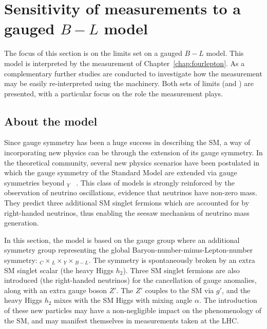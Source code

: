 \section{Sensitivity of \LHC measurements to a gauged $B-L$ model}
\label{sec:BL}
The focus of this section is on the limits set on a gauged $B-L$ model. This model is interpreted by the \ATLAS \mFourL{} measurement of Chapter~\ref{chap:fourlepton}. As a complementary further studies are conducted to investigate how the \mFourL{} measurement may be easily re-interpreted using the \contur machinery. Both sets of limits (\ATLAS and \contur) are presented, with a particular focus on the role the \mFourL{} measurement plays. 

\subsection{About the model}
Since gauge symmetry has been a huge success in describing the SM, a way of incorporating new physics can be through the extension of its gauge symmetry. In the theoretical community, several new physics scenarios have been postulated in which the gauge symmetry of the Standard Model are extended via  gauge symmetries beyond $_Y$ \cite{Pollard:2017sjg,PhysRevD-95-035025}~. This class of models is strongly reinforced by the observation of neutrino oscillations, evidence that neutrinos have non-zero mass. They predict three additional SM singlet fermions which are accounted for by right-handed neutrinos, thus enabling the seesaw mechanism of neutrino mass generation. 

In this section, the model is based on the gauge group where an additional \BLgroup{} symmetry group representing the global Baryon-number-minus-Lepton-number symmetry: $_C\times$$_L\times$$_Y\times$$_{B-L}$. The symmetry is spontaneously broken by an extra SM singlet scalar (the heavy Higgs $h_2$). Three SM singlet fermions are also introduced (the right-handed neutrinos) for the cancellation of gauge anomalies, along with an extra gauge boson $Z'$. The $Z'$ couples to the SM via $g'$, and the heavy Higgs $h_2$ mixes with the SM Higgs with mixing angle $\alpha$. The introduction of these new particles may have a non-negligible impact on the phenomenology of the SM, and may manifest themselves in measurements taken at the LHC. 

